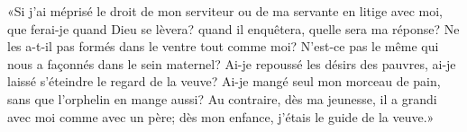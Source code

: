 «Si j’ai méprisé le droit de mon serviteur ou de ma servante en litige avec moi,
	que ferai-je quand Dieu se lèvera?
	quand il enquêtera, quelle sera ma réponse?
Ne les a-t-il pas formés dans le ventre tout comme moi?
N’est-ce pas le même qui nous a façonnés dans le sein maternel?
Ai-je repoussé les désirs des pauvres, ai-je laissé s’éteindre le regard de la veuve?
Ai-je mangé seul mon morceau de pain, sans que l’orphelin en mange aussi?
Au contraire, dès ma jeunesse, il a grandi avec moi comme avec un père;
	dès mon enfance, j’étais le guide de la veuve.»

